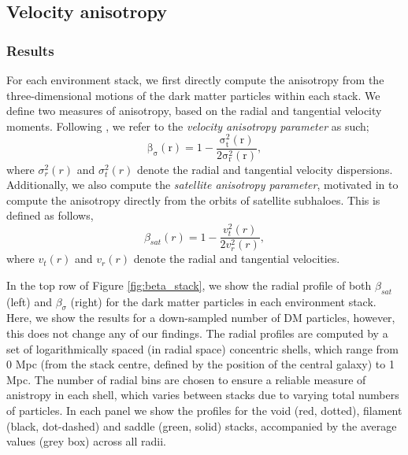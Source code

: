 \subsection{Velocity anisotropy} \label{sec:velocity_anisotropy}
\subsubsection{Results}
For each environment stack, we first directly compute the anisotropy from the three-dimensional motions of the dark matter particles within each stack. We define two measures of anisotropy, based on the radial and tangential velocity moments. Following \citet{faltenbacher2010}, we refer to the \textit{velocity anisotropy parameter} as such;
\begin{equation} \label{eq:vel_ani_sigma}
\mathrm{\beta_{\sigma}(r) = 1 - \frac{\sigma_t^2(r)}{2 \sigma_r^2(r)} },
\end{equation}
where $\sigma_r^2(r)$ and $\sigma_t^2(r)$ denote the radial and tangential velocity dispersions. Additionally, we also compute the \textit{satellite anisotropy parameter}, motivated in \citet{garaldi2018} to compute the anisotropy directly from the orbits of satellite subhaloes. This is defined as follows,
\begin{equation}
\beta_{sat}(r) = 1 - \frac{v_{t}^2(r)}{2 v_{r}^{2}(r)},
\end{equation}
where $v_{t}(r)$ and $v_{r}(r)$ denote the radial and tangential velocities.

In the top row of Figure \ref{fig:beta_stack}, we show the radial profile of both $\beta_{sat}$ (left) and $\beta_{\sigma}$ (right) for the dark matter particles in each environment stack. Here, we show the results for a down-sampled number of DM particles, however, this does not change any of our findings. The radial profiles are computed by a set of logarithmically spaced (in radial space) concentric shells, which range from 0 Mpc (from the stack centre, defined by the position of the central galaxy) to 1 Mpc. The number of radial bins are chosen to ensure a reliable measure of anistropy in each shell, which varies between stacks due to varying total numbers of particles. In each panel we show the profiles for the void (red, dotted), filament (black, dot-dashed) and saddle (green, solid) stacks, accompanied by the average values (grey box) across all radii. 

